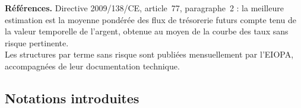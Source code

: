 \begin{refreg}
\textbf{Références.} Directive 2009/138/CE, article~77, paragraphe~2 : la
meilleure estimation est la moyenne pondérée des flux de trésorerie futurs
compte tenu de la valeur temporelle de l'argent, obtenue au moyen de la courbe
des taux sans risque pertinente. \\
Les structures par terme sans risque sont publiées mensuellement par l'EIOPA,
accompagnées de leur documentation technique.
\end{refreg}

\subsection*{Notations introduites}
\begin{description}[leftmargin=3cm, style=nextline, font=\normalfont]
\end{description}
